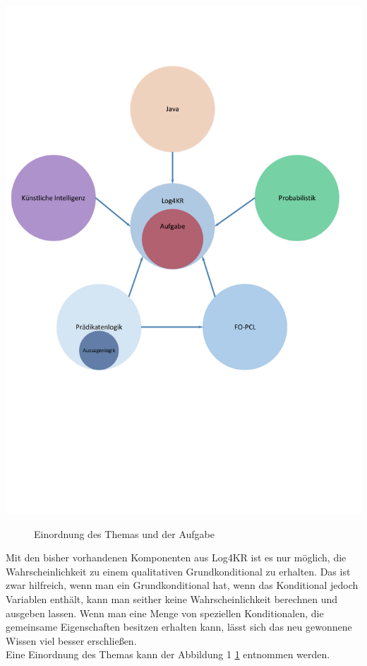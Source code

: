 \documentclass[draft]{scrreprt}
\begin{document}
\includegraphics[scale = 0.3]{Graphics/Eingangsbild}
\begin{figure}[h]
	\caption{Einordnung des Themas und der Aufgabe}
	\label{Eingangsgrafik}
\end{figure}
\newpage

Mit den bisher vorhandenen Komponenten aus Log4KR ist es nur möglich, die Wahrscheinlichkeit zu einem qualitativen Grundkonditional zu erhalten. Das ist zwar hilfreich, wenn man ein Grundkonditional hat, wenn das Konditional jedoch Variablen enthält, kann man seither keine Wahrscheinlichkeit berechnen und ausgeben lassen.
Wenn man eine Menge von speziellen Konditionalen, die gemeinsame Eigenschaften besitzen erhalten kann, lässt sich das neu gewonnene Wissen viel besser erschließen. \\
Eine Einordnung des Themas kann der Abbildung 1 \ref{Eingangsgrafik} entnommen werden.
\end{document}
